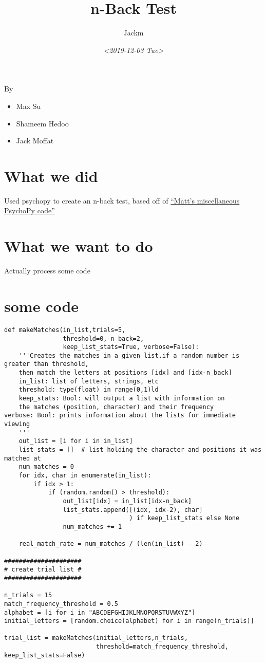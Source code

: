 \documentclass[11pt]{article}
\author{Jackm}
\date{\textit{<2019-12-03 Tue>}}
\title{n-Back Test}
\begin{document}
\maketitle
By
\begin{itemize}
\item Max Su
\item Shameem Hedoo
\item Jack Moffat
\end{itemize}


\section{What we did}
\label{sec:org67f5a69}
Used psychopy to create an n-back test, based off of \href{https://osf.io/ewu5m/}{``Matt's miscellaneous PsychoPy code''}



\section{What we want to do}
\label{sec:org9903b4d}
Actually process some code

\section{some code}
\label{sec:orga0dfb9c}
\begin{verbatim}
def makeMatches(in_list,trials=5,
                threshold=0, n_back=2,
                keep_list_stats=True, verbose=False):
    '''Creates the matches in a given list.if a random number is greater than threshold,
    then match the letters at positions [idx] and [idx-n_back]
    in_list: list of letters, strings, etc
    threshold: type(float) in range(0,1)ld
    keep_stats: Bool: will output a list with information on
    the matches (position, character) and their frequency
verbose: Bool: prints information about the lists for immediate viewing
    '''
    out_list = [i for i in in_list]
    list_stats = []  # list holding the character and positions it was matched at
    num_matches = 0
    for idx, char in enumerate(in_list):
        if idx > 1:
            if (random.random() > threshold):
                out_list[idx] = in_list[idx-n_back]
                list_stats.append([(idx, idx-2), char]
                                  ) if keep_list_stats else None
                num_matches += 1

    real_match_rate = num_matches / (len(in_list) - 2)

#####################
# create trial list #
#####################

n_trials = 15
match_frequency_threshold = 0.5
alphabet = [i for i in "ABCDEFGHIJKLMNOPQRSTUVWXYZ"]
initial_letters = [random.choice(alphabet) for i in range(n_trials)]

trial_list = makeMatches(initial_letters,n_trials,
                         threshold=match_frequency_threshold, keep_list_stats=False)

\end{verbatim}
\end{document}
